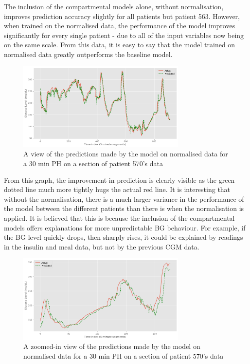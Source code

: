     The inclusion of the compartmental models alone, without normalisation, improves prediction accuracy slightly for all patients but patient 563. However, when trained on the normalised data, the performance of the model improves significantly for every single patient - due to all of the input variables now being on the same scale. From this data, it is easy to say that the model trained on normalised data greatly outperforms the baseline model.

    \begin{figure}[H]
      \centering

      \includegraphics[width=0.75\textwidth]{images/Compartmental.png}
      \caption{
       A view of the predictions made by the model on normalised data for a 30 min PH on a section of patient 570's data
      }
    \end{figure}

    From this graph, the improvement in prediction is clearly visible as the green dotted line much more tightly hugs the actual red line. It is interesting that without the normalisation, there is a much larger variance in the performance of the model between the different patients than there is when the normalisation is applied. It is believed that this is because the inclusion of the compartmental models offers explanations for more unpredictable BG behaviour. For example, if the BG level quickly drops, then sharply rises, it could be explained by readings in the insulin and meal data, but not by the previous CGM data.

    \begin{figure}[H]
      \centering

      \includegraphics[width=0.75\textwidth]{images/ZoomedinCompart.png}
      \caption{
       A zoomed-in view of the predictions made by the model on normalised data for a 30 min PH on a section of patient 570's data
      }
    \end{figure}

